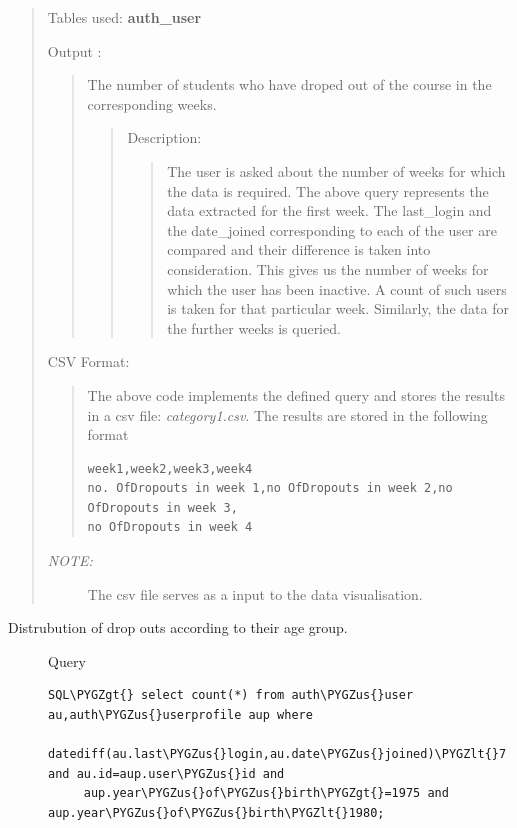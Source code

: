 \documentclass[a4paper,12pt,oneside]{sphinxmanual}
\def\PYGZus{\char`\_}
\def\PYGZlt{\char`\<}
\def\PYGZgt{\char`\>}
\begin{document}
\begin{itemize}
\begin{quote}
Tables used: \textbf{auth\_user}

Output :
\begin{quote}

The number of students who have droped out of the course in the corresponding weeks.
\begin{quote}

Description:
\begin{quote}

The user is asked about the number of weeks for which the data is required.
The above query represents the data extracted for the first week.
The last\_login and the date\_joined corresponding to each of the user are compared and their difference is taken into consideration. This gives us the number of weeks for which the user has been inactive. A count of such users is taken for that particular week.
Similarly, the data for the further weeks is queried.
\end{quote}
\end{quote}
\end{quote}

CSV Format:
\begin{quote}

The above code implements the defined query and stores the results in a csv file: \emph{category1.csv}.
The results are stored in the following format

\begin{Verbatim}[commandchars=\\\{\}]
week1,week2,week3,week4
no. OfDropouts in week 1,no OfDropouts in week 2,no
OfDropouts in week 3,
no OfDropouts in week 4
\end{Verbatim}
\end{quote}
\begin{description}
\item[{\emph{NOTE:}}] \leavevmode
The csv file serves as a input to the data visualisation.

\end{description}
\end{quote}
\begin{description}
\item[{Distrubution of drop outs according to their age group.}] \leavevmode
Query

\begin{Verbatim}[commandchars=\\\{\}]
SQL\PYGZgt{} select count(*) from auth\PYGZus{}user au,auth\PYGZus{}userprofile aup where
     datediff(au.last\PYGZus{}login,au.date\PYGZus{}joined)\PYGZlt{}7 and au.id=aup.user\PYGZus{}id and
     aup.year\PYGZus{}of\PYGZus{}birth\PYGZgt{}=1975 and aup.year\PYGZus{}of\PYGZus{}birth\PYGZlt{}1980;
\end{Verbatim}


\end{description}
\end{itemize}
\end{document}
